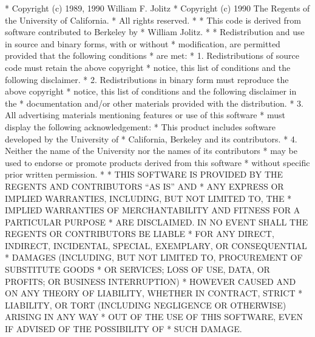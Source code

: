 \begin{copyrightEnv}
 * Copyright (c) 1989, 1990 William F. Jolitz
 * Copyright (c) 1990 The Regents of the University of California.
 * All rights reserved.
 *
 * This code is derived from software contributed to Berkeley by
 * William Jolitz.
 *
 * Redistribution and use in source and binary forms, with or without
 * modification, are permitted provided that the following conditions
 * are met:
 * 1. Redistributions of source code must retain the above copyright
 *    notice, this list of conditions and the following disclaimer.
 * 2. Redistributions in binary form must reproduce the above copyright
 *    notice, this list of conditions and the following disclaimer in the
 *    documentation and/or other materials provided with the distribution.
 * 3. All advertising materials mentioning features or use of this software
 *    must display the following acknowledgement:
 *      This product includes software developed by the University of
 *      California, Berkeley and its contributors.
 * 4. Neither the name of the University nor the names of its contributors
 *    may be used to endorse or promote products derived from this software
 *    without specific prior written permission.
 *
 * THIS SOFTWARE IS PROVIDED BY THE REGENTS AND CONTRIBUTORS ``AS IS'' AND
 * ANY EXPRESS OR IMPLIED WARRANTIES, INCLUDING, BUT NOT LIMITED TO, THE
 * IMPLIED WARRANTIES OF MERCHANTABILITY AND FITNESS FOR A PARTICULAR PURPOSE
 * ARE DISCLAIMED.  IN NO EVENT SHALL THE REGENTS OR CONTRIBUTORS BE LIABLE
 * FOR ANY DIRECT, INDIRECT, INCIDENTAL, SPECIAL, EXEMPLARY, OR CONSEQUENTIAL
 * DAMAGES (INCLUDING, BUT NOT LIMITED TO, PROCUREMENT OF SUBSTITUTE GOODS
 * OR SERVICES; LOSS OF USE, DATA, OR PROFITS; OR BUSINESS INTERRUPTION)
 * HOWEVER CAUSED AND ON ANY THEORY OF LIABILITY, WHETHER IN CONTRACT, STRICT
 * LIABILITY, OR TORT (INCLUDING NEGLIGENCE OR OTHERWISE) ARISING IN ANY WAY
 * OUT OF THE USE OF THIS SOFTWARE, EVEN IF ADVISED OF THE POSSIBILITY OF
 * SUCH DAMAGE.
\end{copyrightEnv}


